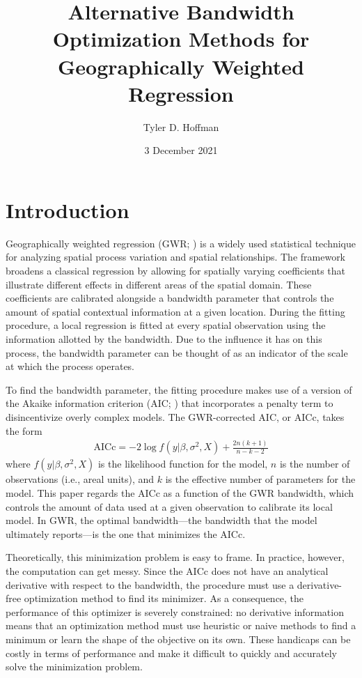 \documentclass[letterpaper,12pt,twocolumn]{article}
\title{\Large Alternative Bandwidth Optimization Methods for Geographically Weighted Regression}
\author{Tyler D. Hoffman}
\date{3 December 2021}
\begin{document}
\maketitle

\section{Introduction}
\label{sec:introduction}
Geographically weighted regression (GWR; \cite{Fotheringham2003}) is a widely used statistical technique for analyzing spatial process variation and spatial relationships. The framework broadens a classical regression by allowing for spatially varying coefficients that illustrate different effects in different areas of the spatial domain. These coefficients are calibrated alongside a bandwidth parameter that controls the amount of spatial contextual information at a given location. During the fitting procedure, a local regression is fitted at every spatial observation using the information allotted by the bandwidth. Due to the influence it has on this process, the bandwidth parameter can be thought of as an indicator of the scale at which the process operates.

To find the bandwidth parameter, the fitting procedure makes use of a version of the Akaike information criterion (AIC; \cite{Akaike1973}) that incorporates a penalty term to disincentivize overly complex models. The GWR-corrected AIC, or AICc, takes the form \cite{Fotheringham2003} \begin{align*}
    \text{AICc} = -2\log f(y | \beta, \sigma^2, X) + \frac{2n(k+1)}{n-k-2}
\end{align*} where $f(y | \beta, \sigma^2, X)$ is the likelihood function for the model, $n$ is the number of observations (i.e., areal units), and $k$ is the effective number of parameters for the model. This paper regards the AICc as a function of the GWR bandwidth, which controls the amount of data used at a given observation to calibrate its local model. In GWR, the optimal bandwidth---the bandwidth that the model ultimately reports---is the one that minimizes the AICc.

Theoretically, this minimization problem is easy to frame. In practice, however, the computation can get messy. Since the AICc does not have an analytical derivative with respect to the bandwidth, the procedure must use a derivative-free optimization method to find its minimizer. As a consequence, the performance of this optimizer is severely constrained: no derivative information means that an optimization method must use heuristic or naive methods to find a minimum or learn the shape of the objective on its own. These handicaps can be costly in terms of performance and make it difficult to quickly and accurately solve the minimization problem.
\end{document}
